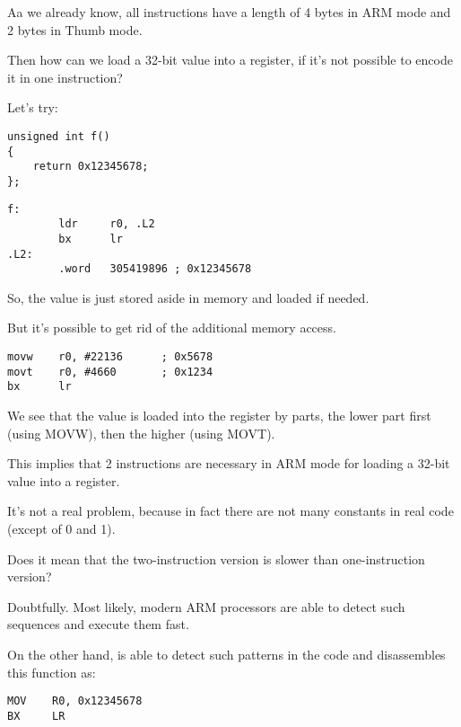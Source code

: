 ﻿
\label{ARM_big_constants}

\label{ARM_big_constants_loading}

Aa we already know, all instructions have a length of 4 bytes in ARM mode and 2 bytes in Thumb mode.

Then how can we load a 32-bit value into a register, if it's not possible to encode it in one instruction?

Let's try:

\begin{lstlisting}
unsigned int f()
{
	return 0x12345678;
};
\end{lstlisting}

\begin{lstlisting}[caption=GCC 4.6.3 -O3 \ARMMode]
f:
        ldr     r0, .L2
        bx      lr
.L2:
        .word   305419896 ; 0x12345678
\end{lstlisting}

So, the  value is just stored aside in memory and loaded if needed.

But it's possible to get rid of the additional memory access.

\begin{lstlisting}[caption=GCC 4.6.3 -O3 -march{=}armv7-a (\ARMMode)]
movw    r0, #22136      ; 0x5678
movt    r0, #4660       ; 0x1234
bx      lr
\end{lstlisting}

We see that the value is loaded into the register by parts, the lower part first (using MOVW), 
then the higher (using MOVT).

This implies that 2 instructions are necessary in ARM mode for loading a 32-bit value into a register.

It's not a real problem, because in fact there are not many constants in real code (except of 0 and 1).

Does it mean that the two-instruction version is slower than one-instruction version?

Doubtfully. Most likely, modern ARM processors are able to detect such sequences and execute
them fast.

On the other hand, \IDA is able to detect such patterns in the code and disassembles this function as:

\begin{lstlisting}
MOV    R0, 0x12345678
BX     LR
\end{lstlisting}

